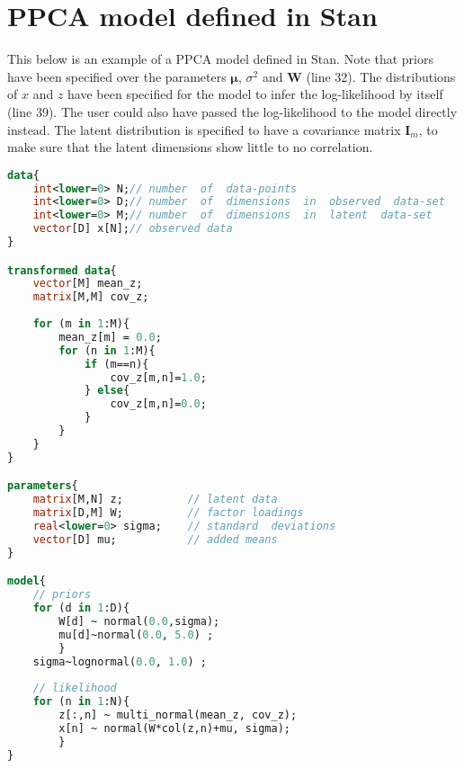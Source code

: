 \chapter{PPCA model defined in Stan}\label{AP:ppca_stan}

This below is an example of a PPCA model defined in Stan. Note that priors have been specified over the parameters $\bm{\mu}$, $\sigma^2$ and $\bm{W}$ (line 32). The distributions of $x$ and $z$ have been specified for the model to infer the log-likelihood by itself (line 39). The user could also have passed the log-likelihood to the model directly instead. The latent distribution is specified to have a covariance matrix $\bm{I}_m$, to make sure that the latent dimensions show little to no correlation.

\vspace{25px}

\begin{lstlisting}[caption={PCPA model defined in Stan}, label={lst:ppca}, language=Stan]
data{
    int<lower=0> N;// number  of  data-points
    int<lower=0> D;// number  of  dimensions  in  observed  data-set
    int<lower=0> M;// number  of  dimensions  in  latent  data-set
    vector[D] x[N];// observed data
}

transformed data{
    vector[M] mean_z;
    matrix[M,M] cov_z;
    
    for (m in 1:M){
        mean_z[m] = 0.0;
        for (n in 1:M){
            if (m==n){
                cov_z[m,n]=1.0;
            } else{
                cov_z[m,n]=0.0;
            }
        }
    }
}

parameters{
    matrix[M,N] z;          // latent data
    matrix[D,M] W;          // factor loadings
    real<lower=0> sigma;    // standard  deviations
    vector[D] mu;           // added means
}

model{
    // priors
    for (d in 1:D){
        W[d] ~ normal(0.0,sigma);
        mu[d]~normal(0.0, 5.0) ;
        }
    sigma~lognormal(0.0, 1.0) ;
    
    // likelihood
    for (n in 1:N){
        z[:,n] ~ multi_normal(mean_z, cov_z);
        x[n] ~ normal(W*col(z,n)+mu, sigma);
        }    
}
\end{lstlisting}
